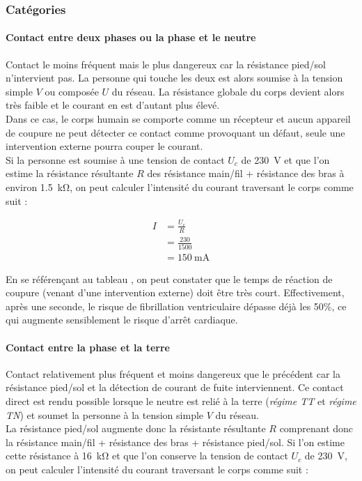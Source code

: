 \subsubsection{Catégories}



\paragraph{Contact entre deux phases ou la phase et le neutre} 
Contact le moins fréquent mais le plus dangereux car la résistance pied/sol n'intervient pas. La personne qui touche les deux est alors soumise à la tension simple $V$ ou composée $U$ du réseau. La résistance globale du corps devient alors très faible et le courant en est d'autant plus élevé.\\ Dans ce cas, le corps humain se comporte comme un récepteur et aucun appareil de coupure ne peut détecter ce contact comme provoquant un défaut, seule une intervention externe pourra couper le courant.\\

Si la personne est soumise à une tension de contact $U_c$ de \SI{230}{\volt} et que l'on estime la résistance résultante $R$ des résistance main/fil + résistance des bras à environ \SI{1,5}{\kilo\ohm}, on peut calculer l'intensité du courant traversant le corps comme suit :

\begin{align*}
I 	&= \frac{U_c}{R} \\
	&= \frac{230}{1500} \\
	&= \SI{150}{\milli\ampere}
\end{align*}

En se référençant au tableau , on peut constater que le temps de réaction de coupure (venant d'une intervention externe) doit être très court. Effectivement, après une seconde, le risque de fibrillation ventriculaire dépasse déjà les 50\%, ce qui augmente sensiblement le risque d'arrêt cardiaque.



\paragraph{Contact entre la phase et la terre}
Contact relativement plus fréquent et moins dangereux que le précédent car la résistance pied/sol et la détection de courant de fuite interviennent. Ce contact direct est rendu possible lorsque le neutre est relié à la terre (\emph{régime TT} et \emph{régime TN}) et soumet la personne à la tension simple $V$ du réseau.\\
La résistance pied/sol augmente donc la résistante résultante $R$ comprenant donc la résistance main/fil + résistance des bras + résistance pied/sol. Si l'on estime cette résistance à \SI{16}{\kilo\ohm} et que l'on conserve la tension de contact $U_c$ de \SI{230}{\volt}, on peut calculer l'intensité du courant traversant le corps comme suit :


